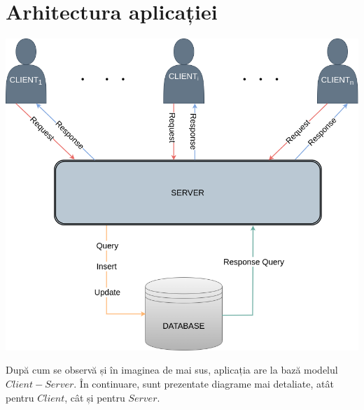 \documentclass[runningheads]{llncs}
\begin{document}
	\section{Arhitectura aplicației}
	\begin{center}
		\includegraphics[scale=0.4]{diagram.png}
	\end{center}
	După cum se observă și în imaginea de mai sus, aplicația are la bază modelul $Client-Server$.
	În continuare, sunt prezentate diagrame mai detaliate, atât pentru $Client$, cât și pentru $Server$.
\end{document}
